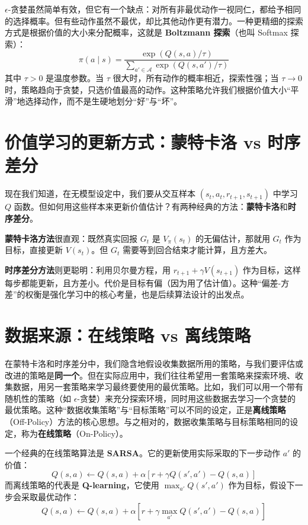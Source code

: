 \documentclass[lang=cn,zihao=-4,a4paper,fontset=windows]{beautybook}
\begin{document}
\(\epsilon\)-贪婪虽然简单有效，但它有一个缺点：对所有非最优动作一视同仁，都给予相同的选择概率。但有些动作虽然不最优，却比其他动作更有潜力。一种更精细的探索方式是根据价值的大小来分配概率，这就是 \textbf{Boltzmann 探索}（也叫 Softmax 探索）：
\[
\pi(a \mid s) = \frac{\exp(Q(s, a)/\tau)}{\sum_{a' \in \mathcal{A}} \exp(Q(s, a')/\tau)}
\]
其中 \(\tau > 0\) 是温度参数。当 \(\tau\) 很大时，所有动作的概率相近，探索性强；当 \(\tau \to 0\) 时，策略趋向于贪婪，只选价值最高的动作。这种策略允许我们根据价值大小“平滑”地选择动作，而不是生硬地划分“好”与“坏”。

\section{价值学习的更新方式：蒙特卡洛 vs 时序差分}

现在我们知道，在无模型设定中，我们要从交互样本 \((s_t, a_t, r_{t+1}, s_{t+1})\) 中学习 \(Q\) 函数。但如何用这些样本来更新价值估计？有两种经典的方法：\textbf{蒙特卡洛}和\textbf{时序差分}。

\textbf{蒙特卡洛方法}很直观：既然真实回报 \(G_t\) 是 \(V_\pi(s_t)\) 的无偏估计，那就用 \(G_t\) 作为目标，直接更新 \(V(s_t)\)。但 \(G_t\) 需要等到回合结束才能计算，且方差大。

\textbf{时序差分方法}则更聪明：利用贝尔曼方程，用 \(r_{t+1} + \gamma V(s_{t+1})\) 作为目标，这样每步都能更新，且方差小。代价是目标有偏（因为用了估计值）。这种“偏差-方差”的权衡是强化学习中的核心考量，也是后续算法设计的出发点。

\section{数据来源：在线策略 vs 离线策略}

在蒙特卡洛和时序差分中，我们隐含地假设收集数据所用的策略，与我们要评估或改进的策略是\textbf{同一个}。但在实际应用中，我们往往希望用一套策略来探索环境、收集数据，用另一套策略来学习最终要使用的最优策略。比如，我们可以用一个带有随机性的策略（如 \(\epsilon\)-贪婪）来充分探索环境，同时用这些数据去学习一个贪婪的最优策略。这种“数据收集策略”与“目标策略”可以不同的设定，正是\textbf{离线策略}（Off-Policy）方法的核心思想。与之相对的，数据收集策略与目标策略相同的设定，称为\textbf{在线策略}（On-Policy）。

一个经典的在线策略算法是 \textbf{SARSA}。它的更新使用实际采取的下一步动作 \(a'\) 的价值：
\[
Q(s,a) \leftarrow Q(s,a) + \alpha [r + \gamma Q(s',a') - Q(s,a)]
\]
而离线策略的代表是 \textbf{Q-learning}，它使用 \(\max_{a'} Q(s',a')\) 作为目标，假设下一步会采取最优动作：
\[
Q(s,a) \leftarrow Q(s,a) + \alpha [r + \gamma \max_{a'} Q(s',a') - Q(s,a)]
\]
\end{document}
